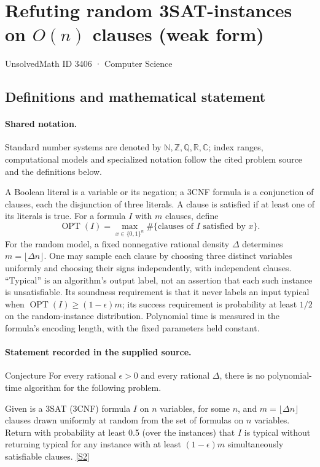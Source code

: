 \documentclass[11pt]{article}
\newcommand{\sref}[2]{\hyperlink{source:#1:#2}{[S#2]}}
\begin{document}
\setcounter{section}{3405}
\section{Refuting random 3SAT-instances on $O(n)$ clauses (weak form)}\label{3406}
{\small\sffamily UnsolvedMath ID 3406 · Computer Science}
\subsection{Definitions and mathematical statement}

\paragraph{Shared notation.}Standard number systems are denoted by $\mathbb N,\mathbb Z,\mathbb Q,\mathbb R,\mathbb C$; index ranges, computational models and specialized notation follow the cited problem source and the definitions below.


A Boolean literal is a variable or its negation; a 3CNF formula is a conjunction of clauses, each the disjunction of three literals. A clause is satisfied if at least one of its literals is true. For a formula $I$ with $m$ clauses, define
\[
 \operatorname{OPT}(I)=\max_{x\in\{0,1\}^n}\#\{\text{clauses of }I\text{ satisfied by }x\}.
\]
For the random model, a fixed nonnegative rational density $\Delta$ determines $m=\lfloor\Delta n\rfloor$. One may sample each clause by choosing three distinct variables uniformly and choosing their signs independently, with independent clauses. ``Typical'' is an algorithm's output label, not an assertion that each such instance is unsatisfiable. Its soundness requirement is that it never labels an input typical when $\operatorname{OPT}(I)\ge(1-\epsilon)m$; its success requirement is probability at least $1/2$ on the random-instance distribution. Polynomial time is measured in the formula's encoding length, with the fixed parameters held constant.
\paragraph{Statement recorded in the supplied source.}
Conjecture For every rational $\epsilon > 0$ and every rational $\Delta$, there is no polynomial-time algorithm for the following problem.

Given is a 3SAT (3CNF) formula $I$ on $n$ variables, for some $n$, and $m = \lfloor\Delta n\rfloor$ clauses drawn uniformly at random from the set of formulas on $n$ variables. Return with probability at least 0.5 (over the instances) that $I$ is typical without returning typical for any instance with at least $(1 - \epsilon)m$ simultaneously satisfiable clauses. \sref{3406}{2}
\end{document}
